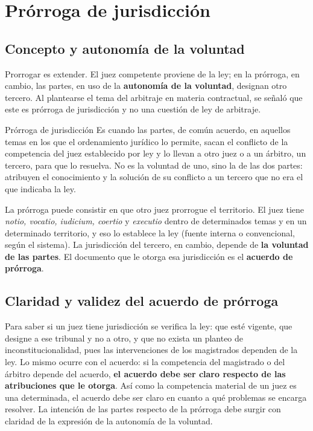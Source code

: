 \documentclass[12pt,oneside]{book}
\begin{document}
\chapter[Prórroga de jurisdicción]{Prórroga de jurisdicción}

\section{Concepto y autonomía de la voluntad}

Prorrogar es extender. El juez competente proviene de la ley; en la prórroga, en cambio, las partes, en uso de la \textbf{autonomía de la voluntad}, designan otro tercero. Al plantearse el tema del arbitraje en materia contractual, se señaló que este es prórroga de jurisdicción y no una cuestión de ley de arbitraje.

\begin{definition}{Prórroga de jurisdicción}
Es cuando las partes, de común acuerdo, en aquellos temas en los que el ordenamiento jurídico lo permite, sacan el conflicto de la competencia del juez establecido por ley y lo llevan a otro juez o a un árbitro, un tercero, para que lo resuelva. No es la voluntad de uno, sino la de las dos partes: atribuyen el conocimiento y la solución de su conflicto a un tercero que no era el que indicaba la ley.
\end{definition}

La prórroga puede consistir en que otro juez prorrogue el territorio. El juez tiene \textit{notio, vocatio, iudicium, coertio} y \textit{executio} dentro de determinados temas y en un determinado territorio, y eso lo establece la ley (fuente interna o convencional, según el sistema). La jurisdicción del tercero, en cambio, depende de \textbf{la voluntad de las partes}. El documento que le otorga esa jurisdicción es el \textbf{acuerdo de prórroga}.

\section{Claridad y validez del acuerdo de prórroga}

Para saber si un juez tiene jurisdicción se verifica la ley: que esté vigente, que designe a ese tribunal y no a otro, y que no exista un planteo de inconstitucionalidad, pues las intervenciones de los magistrados dependen de la ley. Lo mismo ocurre con el acuerdo: si la competencia del magistrado o del árbitro depende del acuerdo, \textbf{el acuerdo debe ser claro respecto de las atribuciones que le otorga}. Así como la competencia material de un juez es una determinada, el acuerdo debe ser claro en cuanto a qué problemas se encarga resolver. La intención de las partes respecto de la prórroga debe surgir con claridad de la expresión de la autonomía de la voluntad.
\end{document}
